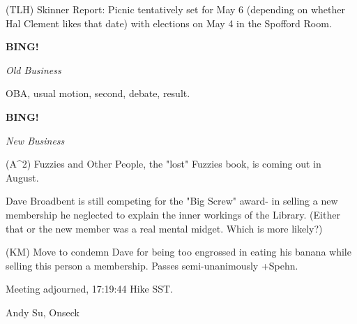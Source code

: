 \documentclass[12pt]{article}
\newcommand{\bing}{{\bf BING!} }
\newcommand{\goto}[1]{\bing \vskip 12pt \centerline{{\em{#1}}}}
\begin{document}
(TLH) Skinner Report: Picnic tentatively set for May 6 (depending on whether Hal Clement likes that date) with elections on May 4 in the Spofford Room.

\goto{Old Business}

OBA, usual motion, second, debate, result.

\goto{New Business}

(A^2) Fuzzies and Other People, the "lost" Fuzzies book, is coming out in August.

Dave Broadbent is still competing for the "Big Screw" award- in selling a new membership he neglected to explain the inner workings of the Library. (Either that or the new member was a real mental midget. Which is more likely?)

(KM) Move to condemn Dave for being too engrossed in eating his banana while selling this person a membership. Passes semi-unanimously +Spehn.

\vspace{12pt}

\noindent
Meeting adjourned, 17:19:44 Hike SST.

\vspace{18pt}

\centerline{Andy Su, Onseck}
\end{document}
